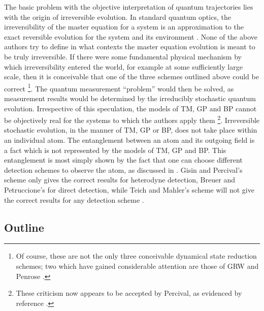 The basic problem with the objective interpretation of quantum 
trajectories lies with the origin of irreversible evolution. In standard
quantum optics, the irreversibility of the master equation for a system 
is an approximation to the exact reversible evolution for the system and its
environment \cite{Gar91}. None of the above authors try to define in what contexts
the master equation  evolution is meant to be truly irreversible. If there were some
fundamental physical mechanism by  which irreversibility entered the world, for
example at some sufficiently  large scale, then it is conceivable that one of the
three schemes outlined above could be correct \footnote{Of course, these are not the
only three conceivable dynamical  state reduction schemes; two which have gained
considerable attention are those of GRW \cite{GRW} and Penrose \cite{Pen90}.}. The
quantum measurement ``problem'' would then be solved,  as measurement results would
be determined by the irreducibly stochastic quantum  evolution. Irrespective of this
speculation, the models of TM, GP and BP cannot be  objectively real for the systems
to which the authors apply them \footnote{These criticism now appears to be accepted
by Percival, as evidenced by reference \cite{Per94}.}. Irreversible stochastic
evolution, in the manner of TM, GP or BP, does not take place within an individual
atom. The entanglement between an atom and its outgoing field  is a fact which is not
represented by the models of TM, GP and BP. This  entanglement is most simply shown
by the fact that one can choose different detection schemes to observe the atom, as
discussed in \cite{WisMil93c}. Gisin and Percival's scheme only gives the correct
results for heterodyne detection, Breuer and Petruccione's for direct detection,
while Teich and Mahler's scheme will not give the correct results for any detection
scheme \cite{WisMil93c}.

\subsection{Outline}

